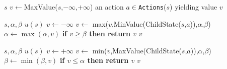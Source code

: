 \documentclass[10pt, letterpaper]{report}
\begin{document}
 \begin{algorithm}
    \caption{AlphaBetaPruning}\label{alg:alphabetapruning}
    \begin{algorithmic}
    \Require $s$
    \State $v\leftarrow$MaxValue($s$,$-\infty$,$+\infty$)
    \State\Return an action $a\in $\texttt{Actions}($s$) yielding value $v$
    \end{algorithmic}
\end{algorithm}
 \begin{algorithm}
    \caption{MaxValue}\label{alg:ABMaxValue}
    \begin{algorithmic}
    \Require $s,\alpha,\beta$
    \State\Return $u(s)$
    \EndIf
    \State$v\leftarrow -\infty$
    \State $v\leftarrow$ max($v$,MinValue(ChildState($s$,$a$)),$\alpha$,$\beta$)
    \State$\alpha\leftarrow\max(\alpha,v)$
    \State\textbf{if $v\ge\beta$ then return $v$}
    \EndFor 
    \State\Return $v$
    \end{algorithmic}
\end{algorithm}
  \begin{algorithm}
    \caption{MinValue}\label{alg:ABMaxValue}
    \begin{algorithmic}
    \Require $s,\alpha,\beta$
    \State\Return $u(s)$
    \EndIf
    \State$v\leftarrow +\infty$
    \State $v\leftarrow$ min($v$,MaxValue(ChildState($s$,$a$)),$\alpha$,$\beta$)
    \State$\beta\leftarrow\min(\beta,v)$
    \State\textbf{if $v\le\alpha$ then return $v$}
    \EndFor 
    \State\Return $v$
    \end{algorithmic}
\end{algorithm}
\end{document}
